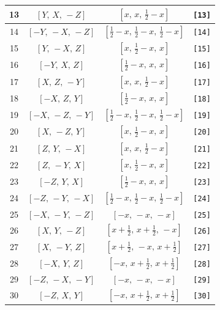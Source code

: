 \documentclass[fleqn,8pt]{jsarticle}
\begin{document}
\begin{longtable}{cccc}
13 & $\left[ Y,\, X,\, - Z \right]$ & $\left[ x,\, x,\, \frac{1}{2} - x \right]$ & {\tt [13]} \\ \hline
14 & $\left[ - Y,\, - X,\, - Z \right]$ & $\left[ \frac{1}{2} - x,\, \frac{1}{2} - x,\, \frac{1}{2} - x \right]$ & {\tt [14]} \\ \hline
15 & $\left[ Y,\, - X,\, Z \right]$ & $\left[ x,\, \frac{1}{2} - x,\, x \right]$ & {\tt [15]} \\ \hline
16 & $\left[ - Y,\, X,\, Z \right]$ & $\left[ \frac{1}{2} - x,\, x,\, x \right]$ & {\tt [16]} \\ \hline
17 & $\left[ X,\, Z,\, - Y \right]$ & $\left[ x,\, x,\, \frac{1}{2} - x \right]$ & {\tt [17]} \\ \hline
18 & $\left[ - X,\, Z,\, Y \right]$ & $\left[ \frac{1}{2} - x,\, x,\, x \right]$ & {\tt [18]} \\ \hline
19 & $\left[ - X,\, - Z,\, - Y \right]$ & $\left[ \frac{1}{2} - x,\, \frac{1}{2} - x,\, \frac{1}{2} - x \right]$ & {\tt [19]} \\ \hline
20 & $\left[ X,\, - Z,\, Y \right]$ & $\left[ x,\, \frac{1}{2} - x,\, x \right]$ & {\tt [20]} \\ \hline
21 & $\left[ Z,\, Y,\, - X \right]$ & $\left[ x,\, x,\, \frac{1}{2} - x \right]$ & {\tt [21]} \\ \hline
22 & $\left[ Z,\, - Y,\, X \right]$ & $\left[ x,\, \frac{1}{2} - x,\, x \right]$ & {\tt [22]} \\ \hline
23 & $\left[ - Z,\, Y,\, X \right]$ & $\left[ \frac{1}{2} - x,\, x,\, x \right]$ & {\tt [23]} \\ \hline
24 & $\left[ - Z,\, - Y,\, - X \right]$ & $\left[ \frac{1}{2} - x,\, \frac{1}{2} - x,\, \frac{1}{2} - x \right]$ & {\tt [24]} \\ \hline
25 & $\left[ - X,\, - Y,\, - Z \right]$ & $\left[ - x,\, - x,\, - x \right]$ & {\tt [25]} \\ \hline
26 & $\left[ X,\, Y,\, - Z \right]$ & $\left[ x + \frac{1}{2},\, x + \frac{1}{2},\, - x \right]$ & {\tt [26]} \\ \hline
27 & $\left[ X,\, - Y,\, Z \right]$ & $\left[ x + \frac{1}{2},\, - x,\, x + \frac{1}{2} \right]$ & {\tt [27]} \\ \hline
28 & $\left[ - X,\, Y,\, Z \right]$ & $\left[ - x,\, x + \frac{1}{2},\, x + \frac{1}{2} \right]$ & {\tt [28]} \\ \hline
29 & $\left[ - Z,\, - X,\, - Y \right]$ & $\left[ - x,\, - x,\, - x \right]$ & {\tt [29]} \\ \hline
30 & $\left[ - Z,\, X,\, Y \right]$ & $\left[ - x,\, x + \frac{1}{2},\, x + \frac{1}{2} \right]$ & {\tt [30]} \\ \hline

\end{longtable}
\end{document}
